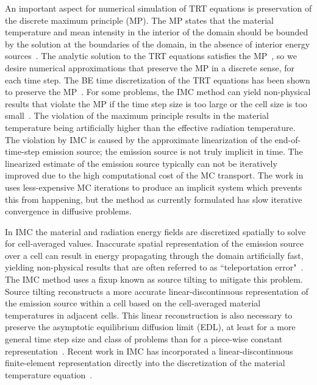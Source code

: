 An important aspect for numerical simulation of TRT equations is preservation of the
discrete maximum principle (MP). The MP states that the material temperature and mean intensity in the
interior of the domain should be bounded by the solution at the boundaries of the domain, in the
absence of interior energy sources~\cite{wollaber2013discrete,larsen_mpv}.  The analytic
solution to the TRT equations satisfies the MP~\cite{larsen_mpv}, so we desire numerical approximations that preserve the MP in
a discrete sense, for each time step.  The BE time discretization of the TRT equations has
been shown to preserve the MP~\cite{larsen_mpv}. For some problems, the IMC method can yield non-physical results that violate the MP if the time
step size is too large or the cell size is too small~\cite{wollaber2013discrete}. The violation of the maximum principle results in the material temperature being artificially
higher than the effective radiation temperature. 
The violation by IMC is caused by the approximate linearization of the end-of-time-step emission source; the emission source
is not truly implicit in time. The linearized estimate of the emission source typically can not be iteratively improved due
to the high computational cost of the MC transport.   
 The work in~\cite{iimc_gentile} uses less-expensive MC
iterations to produce an implicit system which prevents this from happening, but the
method as currently formulated has slow iterative convergence in diffusive problems.  

In IMC the material and radiation energy fields are discretized spatially to solve for cell-averaged values.
Inaccurate spatial representation of the emission source over a cell can result in
energy propagating through the domain artificially fast, yielding non-physical
results that are often referred to as ``teleportation error"~\cite{teleportation}.  The IMC method uses a fixup known as source tilting
to mitigate this problem.  Source tilting reconstructs a more accurate
linear-discontinuous representation of the
emission source within a cell based on the cell-averaged material temperatures in adjacent
cells. This linear reconstruction is also necessary to preserve the asymptotic equilibrium diffusion
limit (EDL), at least for a more general time step size and class of problems than for a piece-wise constant representation~\cite{diff_limit_imc}.   Recent work in IMC has incorporated a linear-discontinuous finite-element representation directly into 
the discretization of the material temperature equation~\cite{wollaeger_ld}.


